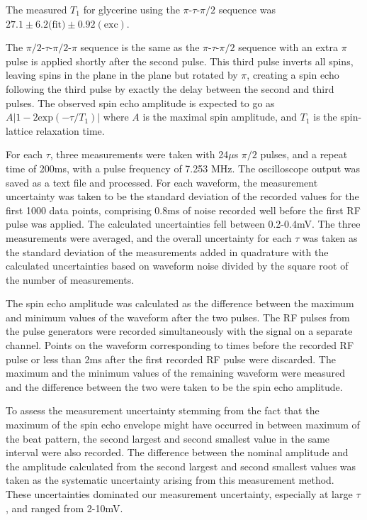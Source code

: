 The measured $T_1$ for glycerine using the $\pi$-$\tau$-$\pi/2$ sequence was $27.1 \pm 6.2\mathrm{(fit}) \pm 0.92 \mathrm{(exc)}$.

The $\pi/2$-$\tau$-$\pi/2$-$\pi$ sequence is the same as the $\pi$-$\tau$-$\pi/2$ sequence with an extra $\pi$ pulse is applied shortly after the second pulse. This third pulse inverts all spins, leaving spins in the plane in the plane but rotated by $\pi$, creating a spin echo following the third pulse by exactly the delay between the second and third pulses. The observed spin echo amplitude is expected to go as $A|1-2\mathrm{exp}(-\tau/T_{1})|$ where $A$ is the maximal spin amplitude, and $T_{1}$ is the spin-lattice relaxation time.

For each $\tau$, three measurements were taken with 24$\mu$s $\pi/2$ pulses, and a repeat time of 200ms, with a pulse frequency of 7.253 MHz. The oscilloscope output was saved as a text file and processed. For each waveform, the measurement uncertainty was taken to be the standard deviation of the recorded values for the first 1000 data points, comprising 0.8ms of noise recorded well before the first RF pulse was applied. The calculated uncertainties fell between 0.2-0.4mV. The three measurements were averaged, and the overall uncertainty for each $\tau$ was taken as the standard deviation of the measurements added in quadrature with the calculated uncertainties based on waveform noise divided by the square root of the number of measurements.

The spin echo amplitude was calculated as the difference between the maximum and minimum values of the waveform after the two pulses. The RF pulses from the pulse generators were recorded simultaneously with the signal on a separate channel. Points on the waveform corresponding to times before the recorded RF pulse or less than 2ms after the first recorded RF pulse were discarded. The maximum and the minimum values of the remaining waveform were measured and the difference between the two were taken to be the spin echo amplitude. 

To assess the measurement uncertainty stemming from the fact that the maximum of the spin echo envelope might have occurred in between maximum of the beat pattern, the second largest and second smallest value in the same interval were also recorded. The difference between the nominal amplitude and the amplitude calculated from the second largest and second smallest values was taken as the systematic uncertainty arising from this measurement method. These uncertainties dominated our measurement uncertainty, especially at large $\tau$, and ranged from 2-10mV.

